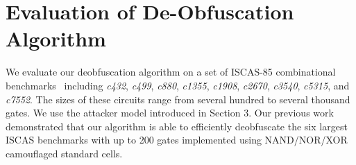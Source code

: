 \documentclass[proposal]{umassthesis}  %
\begin{document}
\chapter{Evaluation of De-Obfuscation Algorithm}
We evaluate our deobfuscation algorithm on a set of ISCAS-85 combinational benchmarks~\cite{hansen-99} including \textit{c432}, \textit{c499},  \textit{c880}, \textit{c1355}, \textit{c1908}, \textit{c2670}, \textit{c3540},  \textit{c5315}, and \textit{c7552}. The sizes of these circuits range from several hundred to several thousand gates. We use the attacker model introduced in Section 3. Our previous work~\cite{duo-date16} demonstrated that our algorithm is able to efficiently deobfuscate the six largest ISCAS benchmarks with up to 200 gates implemented using NAND/NOR/XOR camouflaged standard cells. %










\end{document}
